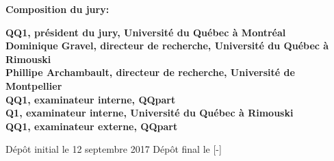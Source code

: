 \thispagestyle{empty}

\null
\vfill
\noindent \textbf{Composition du jury:}\\
\vspace{1cm}

\begin{singlespace}
  \noindent \textbf{QQ1, président du jury, Université du Québec à Montréal}\\

  \noindent \textbf{Dominique Gravel, directeur de recherche, Université du Québec à Rimouski}\\

  \noindent \textbf{Phillipe Archambault, directeur de recherche, Université de Montpellier}\\

  \noindent \textbf{QQ1, examinateur interne, QQpart}\\

  \noindent \textbf{Q1, examinateur interne, Université du Québec à Rimouski}\\

  \noindent \textbf{QQ1, examinateur externe, QQpart}\\
\end{singlespace}

\vspace{2cm}
\noindent Dépôt initial le 12 septembre 2017
\hspace{3cm}
Dépôt final le [-]


\cleardoublepage
